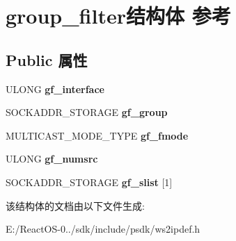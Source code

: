 \hypertarget{structgroup__filter}{}\section{group\+\_\+filter结构体 参考}
\label{structgroup__filter}
\subsection*{Public 属性}
\begin{DoxyCompactItemize}
\item 
\mbox{\label{structgroup__filter_a4d210e49c85ab0622f352bd7fcb5bfa2}} 
U\+L\+O\+NG {\bfseries gf\+\_\+interface}
\item 
\mbox{\label{structgroup__filter_a3af5f029a085709c74b886185e883686}} 
S\+O\+C\+K\+A\+D\+D\+R\+\_\+\+S\+T\+O\+R\+A\+GE {\bfseries gf\+\_\+group}
\item 
\mbox{\label{structgroup__filter_ad0b14818b6fc47baaf3f9072714955cb}} 
M\+U\+L\+T\+I\+C\+A\+S\+T\+\_\+\+M\+O\+D\+E\+\_\+\+T\+Y\+PE {\bfseries gf\+\_\+fmode}
\item 
\mbox{\label{structgroup__filter_a9f28548ee96cedbf8aca16105aaebbdd}} 
U\+L\+O\+NG {\bfseries gf\+\_\+numsrc}
\item 
\mbox{\label{structgroup__filter_ac4e549c0c835f86de8e3c38fec08cfed}} 
S\+O\+C\+K\+A\+D\+D\+R\+\_\+\+S\+T\+O\+R\+A\+GE {\bfseries gf\+\_\+slist} \mbox{[}1\mbox{]}
\end{DoxyCompactItemize}


该结构体的文档由以下文件生成\+:\begin{DoxyCompactItemize}
\item 
E\+:/\+React\+O\+S-\/0../sdk/include/psdk/ws2ipdef.\+h\end{DoxyCompactItemize}
